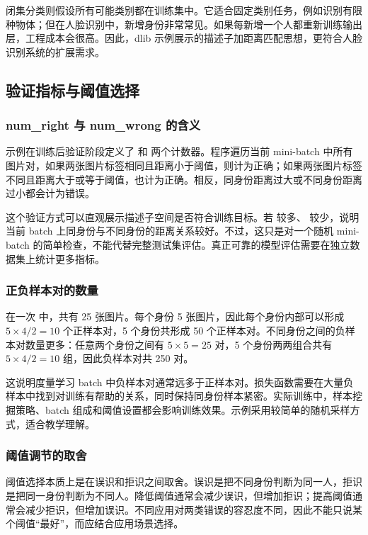 闭集分类则假设所有可能类别都在训练集中。它适合固定类别任务，例如识别有限种物体；但在人脸识别中，新增身份非常常见。如果每新增一个人都重新训练输出层，工程成本会很高。因此，dlib 示例展示的描述子加距离匹配思想，更符合人脸识别系统的扩展需求。

\subsection{验证指标与阈值选择}

\subsubsection{num\_right 与 num\_wrong 的含义}

示例在训练后验证阶段定义了  和  两个计数器。程序遍历当前 mini-batch 中所有图片对，如果两张图片标签相同且距离小于阈值，则计为正确；如果两张图片标签不同且距离大于或等于阈值，也计为正确。相反，同身份距离过大或不同身份距离过小都会计为错误。

这个验证方式可以直观展示描述子空间是否符合训练目标。若  较多、 较少，说明当前 batch 上同身份与不同身份的距离关系较好。不过，这只是对一个随机 mini-batch 的简单检查，不能代替完整测试集评估。真正可靠的模型评估需要在独立数据集上统计更多指标。

\subsubsection{正负样本对的数量}

在一次  中，共有 25 张图片。每个身份 5 张图片，因此每个身份内部可以形成 $5 \times 4 / 2 = 10$ 个正样本对，5 个身份共形成 50 个正样本对。不同身份之间的负样本对数量更多：任意两个身份之间有 $5 \times 5 = 25$ 对，5 个身份两两组合共有 $5 \times 4 / 2 = 10$ 组，因此负样本对共 250 对。

这说明度量学习 batch 中负样本对通常远多于正样本对。损失函数需要在大量负样本中找到对训练有帮助的关系，同时保持同身份样本紧密。实际训练中，样本挖掘策略、batch 组成和阈值设置都会影响训练效果。示例采用较简单的随机采样方式，适合教学理解。

\subsubsection{阈值调节的取舍}

阈值选择本质上是在误识和拒识之间取舍。误识是把不同身份判断为同一人，拒识是把同一身份判断为不同人。降低阈值通常会减少误识，但增加拒识；提高阈值通常会减少拒识，但增加误识。不同应用对两类错误的容忍度不同，因此不能只说某个阈值“最好”，而应结合应用场景选择。

